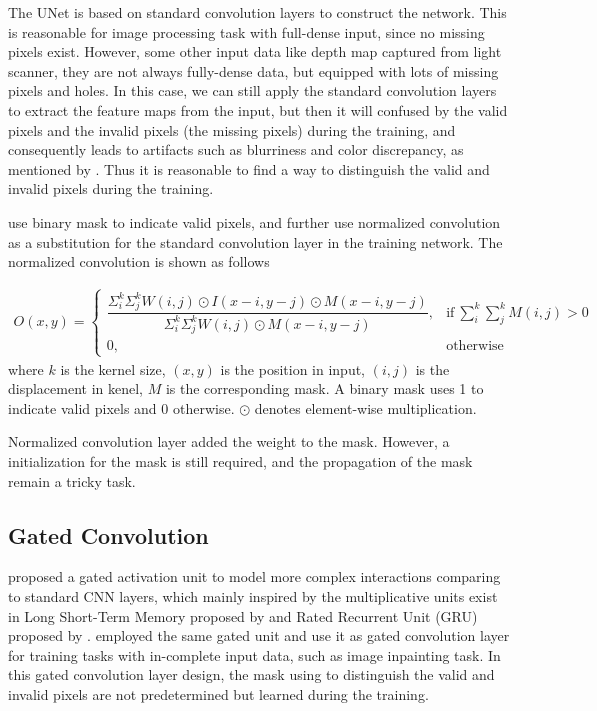 The UNet is based on standard convolution layers to construct the network. This is reasonable for image processing task with full-dense input, since no missing pixels exist. 
However, some other input data like depth map captured from light scanner, they are not always fully-dense data, but equipped with lots of missing pixels and holes. In this case, we can still apply the standard convolution layers to extract the feature maps from the input, but then it will confused by the valid pixels and the invalid pixels (the missing pixels) during the training, and consequently leads to artifacts such as blurriness and color discrepancy, as mentioned by \cite{partial_conv}. Thus it is reasonable to find a way to distinguish the valid and invalid pixels during the training. 


\cite{pncnn0} use binary mask to indicate valid pixels, and further use normalized convolution as a substitution for the standard convolution layer in the training network. The normalized convolution is shown as follows

\begin{equation}
	\begin{array}{rrclcl}
		O(x,y) = 
		\begin{cases}
			\dfrac{\Sigma_i^k\Sigma_j^k W(i,j) \odot I(x-i,y-j) \odot M(x-i,y-j)}{\Sigma_i^k\Sigma_j^k W(i,j) \odot M(x-i,y-j)}, & \text{if}\ \sum_{i}^k\sum_{j}^k M(i,j)>0 \\
			0, & \text{otherwise}
		\end{cases}
	\end{array}
\end{equation}
where $ k $ is the kernel size, $ (x,y) $ is the position in input, $ (i,j) $ is the displacement in kenel, $ M $ is the corresponding mask. A binary mask uses 1 to indicate valid pixels and 0 otherwise. $ \odot $ denotes element-wise multiplication.

Normalized convolution layer added the weight to the mask. However, a initialization for the mask is still required, and the propagation of the mask remain a tricky task. 

\subsection{Gated Convolution}

\cite{gated_activation} proposed a gated activation unit to model more complex interactions comparing to standard CNN layers, which mainly inspired by the multiplicative units exist in Long Short-Term Memory proposed by \cite{lstm} and Rated Recurrent Unit (GRU) proposed by \cite{gru}. \cite{gconv} employed the same gated unit and use it as gated convolution layer for training tasks with in-complete input data, such as image inpainting task. In this gated convolution layer design, the mask using to distinguish the valid and invalid pixels are not predetermined but learned during the training. 

